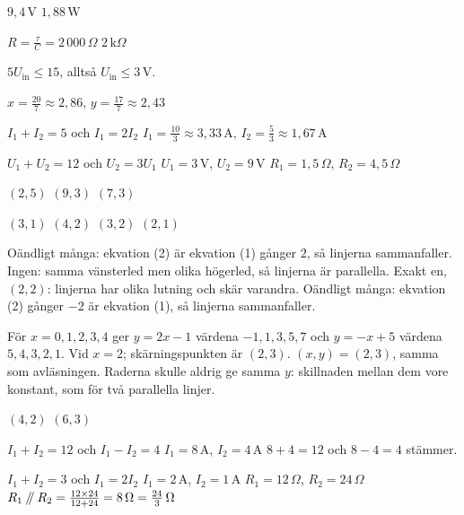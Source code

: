 
\begin{facit}

  $9{,}4\,\text{V}$  $1{,}88\,\text{W}$

  $R = \frac{\tau}{C} = 2\,000\,\Omega$
 $2\,\text{k}\Omega$

 $5U_{\text{in}} \leq 15$, alltså $U_{\text{in}} \leq 3\,\text{V}$.

 $x = \frac{20}{7} \approx 2{,}86$, $y = \frac{17}{7} \approx 2{,}43$

  $I_1 + I_2 = 5$ och $I_1 = 2I_2$
 $I_1 = \frac{10}{3} \approx 3{,}33\,\text{A}$, $I_2 = \frac{5}{3} \approx 1{,}67\,\text{A}$

  $U_1 + U_2 = 12$ och $U_2 = 3U_1$
 $U_1 = 3\,\text{V}$, $U_2 = 9\,\text{V}$
 $R_1 = 1{,}5\,\Omega$, $R_2 = 4{,}5\,\Omega$

  $(2, 5)$  $(9, 3)$  $(7, 3)$

  $(3, 1)$  $(4, 2)$  $(3, 2)$  $(2, 1)$

  Oändligt många: ekvation (2) är ekvation (1) gånger $2$, så linjerna
sammanfaller.
 Ingen: samma vänsterled men olika högerled, så linjerna är parallella.
 Exakt en, $(2, 2)$: linjerna har olika lutning och skär varandra.
 Oändligt många: ekvation (2) gånger $-2$ är ekvation (1), så linjerna sammanfaller.

  För $x = 0, 1, 2, 3, 4$ ger $y = 2x - 1$ värdena $-1, 1, 3, 5, 7$ och
$y = -x + 5$ värdena $5, 4, 3, 2, 1$.
 Vid $x = 2$; skärningspunkten är $(2, 3)$.
 $(x, y) = (2, 3)$, samma som avläsningen.
 Raderna skulle aldrig ge samma $y$: skillnaden mellan dem vore konstant, som för två
parallella linjer.

  $(4, 2)$  $(6, 3)$

  $I_1 + I_2 = 12$ och $I_1 - I_2 = 4$
 $I_1 = 8\,\text{A}$, $I_2 = 4\,\text{A}$
 $8 + 4 = 12$ och $8 - 4 = 4$ stämmer.

  $I_1 + I_2 = 3$ och $I_1 = 2I_2$
 $I_1 = 2\,\text{A}$, $I_2 = 1\,\text{A}$
 $R_1 = 12\,\Omega$, $R_2 = 24\,\Omega$
 $R_1 \mathbin{/\mkern-5mu/} R_2 = \frac{12 \times 24}{12 + 24} = 8\,\Omega = \frac{24}{3}\,\Omega$


\end{facit}
